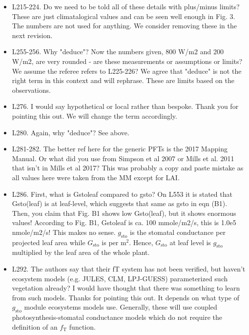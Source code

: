 \documentclass{scrartcl}
\begin{document}
\begin{itemize}
\item {\color{blue}L215-224. Do we need to be told all of these details with plus/minus limits? These are just climatalogical values and can be seen well enough in Fig. 3. The numbers are not used for anything.}
We consider removing these in the next revision.

\item {\color{blue}L255-256. Why "deduce"? Now the numbers given, 800 W/m2 and 200 W/m2, are very rounded - are these measurements or assumptions or limits?}
We assume the referee refers to L225-226? We agree that "deduce" is not the right term in this context and will rephrase. These are limits based on the observations.

\item {\color{blue}L276. I would say hypothetical or local rather than bespoke.}
Thank you for pointing this out. We will change the term accordingly.

\item {\color{blue}L280. Again, why "deduce"?}
See above.

\item {\color{blue}L281-282. The better ref here for the generic PFTs is the 2017 Mapping Manual. Or what did you use from Simpson et al 2007 or Mills et al. 2011 that isn't in Mills et al 2017?}
This was probably a copy and paste mistake as all values here were taken from the MM except for LAI.

\item {\color{blue}L286. First, what is Gstoleaf compared to gsto? On L553 it is stated that Gsto(leaf) is at leaf-level, which suggests that same as gsto in eqn (B1). Then, you claim that Fig. B1 shows low Gsto(leaf), but it shows enormous values! According to Fig. B1, Gstoleaf is ca. 100 mmole/m2/s, this is 1.0e5 nmole/m2/s! This makes no sense.}
$g_\mathrm{sto}$ is the stomatal conductance per projected leaf area while $G_\mathrm{sto}$ is per $\mathrm{m}^2$. Hence, $G_\mathrm{sto}$ at leaf level is $g_\mathrm{sto}$ multiplied by the leaf area of the whole plant.

\item {\color{blue}L292. The authors say that their fT system has not been verified, but haven't ecosystem models (e.g. JULES, CLM, LPJ-GUESS) parameterized such vegetation already? I would have thought that there was something to learn from such models.}
Thanks for pointing this out. It depends on what type of $g_\mathrm{sto}$ module ecosystems models use. Generally, these will use coupled photosynthesis-stomatal conductance models which do not require the definition of an $f_\mathrm{T}$ function.


\end{itemize}
\end{document}
